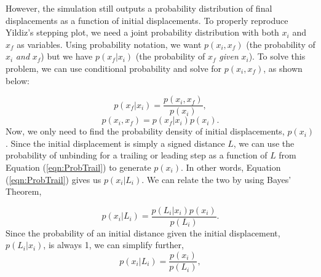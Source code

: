 However, the simulation still outputs a probability distribution of final displacements as a function of initial displacements. To properly reproduce Yildiz's stepping plot, we need a joint probability distribution with both $x_i$ and $x_f$ as variables. Using probability notation, we want $p(x_i,x_f)$ (the probability of $x_i$ \textit{and} $x_f$) but we have $p(x_f|x_i)$ (the probability of $x_f$ \textit{given} $x_i$). To solve this problem, we can use conditional probability and solve for $p(x_i,x_f)$, as shown below:


\[
	p(x_f|x_i)=\frac{p(x_i,x_f)}{p(x_i)},
\]
\begin{equation}
	p(x_i,x_f)=p(x_f|x_i)p(x_i).
\end{equation}
Now, we only need to find the probability density of initial displacements, $p(x_i)$. Since the initial displacement is simply a signed distance $L$, we can use the probability of unbinding for a trailing or leading step as a function of $L$ from Equation (\ref{eqn:ProbTrail}) to generate $p(x_i)$. In other words, Equation (\ref{eqn:ProbTrail}) gives us $p(x_i|L_i)$. We can relate the two by using Bayes' Theorem,

\begin{equation}
	p(x_i|L_i)=\frac{p(L_i|x_i)p(x_i)}{p(L_i)}.
\end{equation}
Since the probability of an initial distance given the initial displacement, $p(L_i|x_i)$, is always 1, we can simplify further,
\[
	p(x_i|L_i)=\frac{p(x_i)}{p(L_i)},
\]


